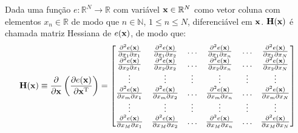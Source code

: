 \begin{proposition}\label{def:hessian}
 Dada uma função $e:\mathbb{R}^{N}\rightarrow \mathbb{R}$ com variável $\VECTOR{x} \in \mathbb{R}^{N}$
 como vetor coluna  com elementos $x_n\in \mathbb{R}$ de modo que $n\in \mathbb{N}$, $1 \leq n \leq N$,
 diferenciável em $\VECTOR{x}$. 
 $\MATRIX{H}(\VECTOR{x})$ é chamada matriz Hessiana \cite[pp. 150]{zhang2017matrix} \cite{Hessian} 
 de $e(\VECTOR{x})$, de modo que: 
 \begin{equation}
  \MATRIX{H}(\VECTOR{x})\equiv \frac{\partial }{\partial \VECTOR{x}} \left( \frac{\partial e(\VECTOR{x})}{ \partial \VECTOR{x}^{\transpose} }\right)=
\left[
\begin{matrix}
\frac{\partial^2 e(\VECTOR{x}) }{\partial x_{1}\partial x_{1}}&
\frac{\partial^2 e(\VECTOR{x}) }{\partial x_{1}\partial x_{2}}&
\hdots&
\frac{\partial^2 e(\VECTOR{x}) }{\partial x_{1}\partial x_{n}}&
\hdots&
\frac{\partial^2 e(\VECTOR{x}) }{\partial x_{1}\partial x_{N}}\\
\frac{\partial^2 e(\VECTOR{x}) }{\partial x_{2}\partial x_{1}}&
\frac{\partial^2 e(\VECTOR{x}) }{\partial x_{2}\partial x_{2}}&
\hdots&
\frac{\partial^2 e(\VECTOR{x}) }{\partial x_{2}\partial x_{n}}&
\hdots&
\frac{\partial^2 e(\VECTOR{x}) }{\partial x_{2}\partial x_{N}}\\
\vdots&
\vdots&
\vdots&
\vdots&
\vdots&
\vdots\\
\frac{\partial^2 e(\VECTOR{x}) }{\partial x_{m}\partial x_{1}}&
\frac{\partial^2 e(\VECTOR{x}) }{\partial x_{m}\partial x_{2}}&
\hdots&
\frac{\partial^2 e(\VECTOR{x}) }{\partial x_{m}\partial x_{n}}&
\hdots&
\frac{\partial^2 e(\VECTOR{x}) }{\partial x_{m}\partial x_{N}}\\
\vdots&
\vdots&
\vdots&
\vdots&
\vdots&
\vdots\\
\frac{\partial^2 e(\VECTOR{x}) }{\partial x_{M}\partial x_{1}}&
\frac{\partial^2 e(\VECTOR{x}) }{\partial x_{M}\partial x_{2}}&
\hdots&
\frac{\partial^2 e(\VECTOR{x}) }{\partial x_{M}\partial x_{n}}&
\hdots&
\frac{\partial^2 e(\VECTOR{x}) }{\partial x_{M}\partial x_{N}}\\
\end{matrix}
\right]
 \end{equation}
\end{proposition}


